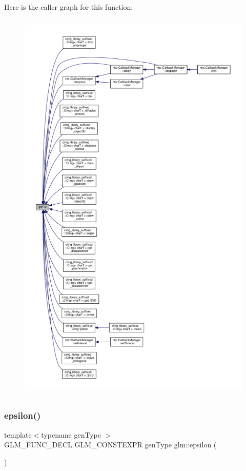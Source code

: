 Here is the caller graph for this function\+:
\nopagebreak
\begin{figure}[H]
\begin{center}
\leavevmode
\includegraphics[height=550pt]{d7/d6f/group__gtc__constants_ga4b7956eb6e2fbedfc7cf2e46e85c5139_icgraph}
\end{center}
\end{figure}
\mbox{\label{group__gtc__constants_ga2a1e57fc5592b69cfae84174cbfc9429}} 
\subsubsection{\texorpdfstring{epsilon()}{epsilon()}}
{\footnotesize\ttfamily template$<$typename gen\+Type $>$ \\
G\+L\+M\+\_\+\+F\+U\+N\+C\+\_\+\+D\+E\+CL G\+L\+M\+\_\+\+C\+O\+N\+S\+T\+E\+X\+PR gen\+Type glm\+::epsilon (\begin{DoxyParamCaption}{ }\end{DoxyParamCaption})}



